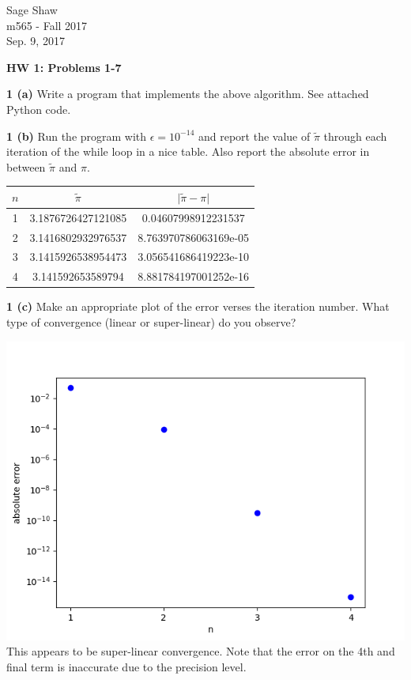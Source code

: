 \documentclass[12pt]{article}
\begin{document}
\thispagestyle{empty}
	
\begin{flushright}
Sage Shaw \\
m565 - Fall 2017 \\
Sep. 9, 2017
\end{flushright}
	
{\large \textbf{HW 1: Problems 1-7}}\bigbreak

\hspace{-7 ex}\textbf{1 (a)} Write a program that implements the above algorithm. \bigbreak
	See attached Python code. \bigbreak
	
\hspace{-7 ex}\textbf{1 (b) } Run the program with $\epsilon = 10^{-14}$ and report the value of $\tilde{\pi}$ through each iteration of the
while loop in a nice table. Also report the absolute error in between $\tilde{\pi}$ and $\pi$. \bigbreak

	\begin{center}
		\begin{tabular}{|c|c|c|}
			\hline
			$n$ & $\tilde{\pi}$ & $\vert \tilde{\pi} - \pi \vert$ \\ \hline
			1 & 3.1876726427121085 & 0.04607998912231537 \\ \hline
			2 & 3.1416802932976537 & 8.763970786063169e-05 \\ \hline
			3 & 3.1415926538954473 & 3.056541686419223e-10 \\ \hline
			4 & 3.141592653589794 & 8.881784197001252e-16 \\ \hline
		\end{tabular}
	\end{center}
	

	
\hspace{-7 ex}\textbf{1 (c) } Make an appropriate plot of the error verses the iteration number. What type of convergence (linear or super-linear) do you observe? \bigbreak

	\includegraphics[scale=.65]{Figure_1} \\
	This appears to be super-linear convergence. Note that the error on the 4th and final term is inaccurate due to the precision level. \bigbreak
\end{document}
